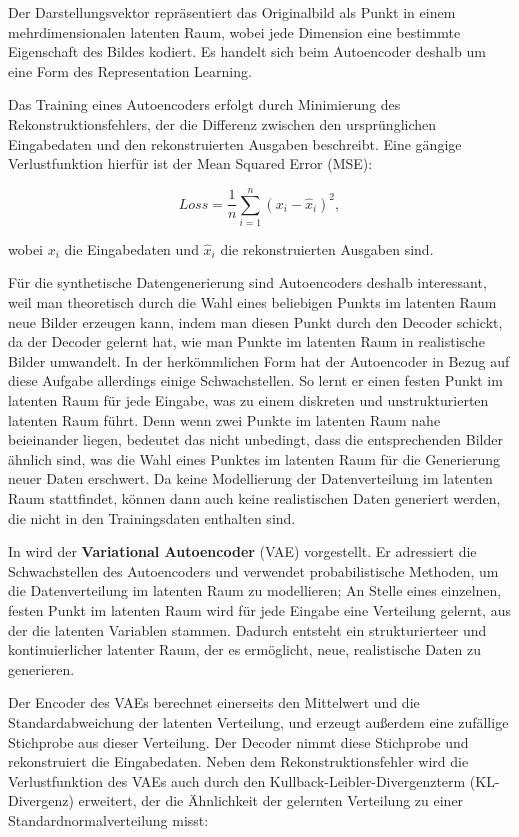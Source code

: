 Der Darstellungsvektor repräsentiert das Originalbild als Punkt in einem mehrdimensionalen latenten Raum, wobei jede Dimension eine bestimmte Eigenschaft des Bildes kodiert. Es handelt sich beim Autoencoder deshalb um eine Form des Representation Learning.

Das Training eines Autoencoders erfolgt durch Minimierung des Rekonstruktionsfehlers, der die Differenz zwischen den ursprünglichen Eingabedaten und den rekonstruierten Ausgaben beschreibt. Eine gängige Verlustfunktion hierfür ist der Mean Squared Error (MSE):

\begin{equation}
	Loss=\frac{1}{n}\sum_{i=1}^n (x_i-\hat{x}_i)^2,
	\label{eq:loss-mse}
\end{equation}

wobei $x_i$ die Eingabedaten und $\hat{x}_i$ die rekonstruierten Ausgaben sind.

Für die synthetische Datengenerierung sind Autoencoders deshalb interessant, weil man theoretisch durch die Wahl eines beliebigen Punkts im latenten Raum neue Bilder erzeugen kann, indem man diesen Punkt durch den Decoder schickt, da der Decoder gelernt hat, wie man Punkte im latenten Raum in realistische Bilder umwandelt. \parencite{Foster2020gendeeplearning} In der herkömmlichen Form hat der Autoencoder in Bezug auf diese Aufgabe allerdings einige Schwachstellen. So lernt er einen festen Punkt im latenten Raum für jede Eingabe, was zu einem diskreten und unstrukturierten latenten Raum führt. Denn wenn zwei Punkte im latenten Raum nahe beieinander liegen, bedeutet das nicht unbedingt, dass die entsprechenden Bilder ähnlich sind, was die Wahl eines Punktes im latenten Raum für die Generierung neuer Daten erschwert. Da keine Modellierung der Datenverteilung im latenten Raum stattfindet, können dann auch keine realistischen Daten generiert werden, die nicht in den Trainingsdaten enthalten sind.

In \parencite{Kingma2022vae} wird der \textbf{Variational Autoencoder} (VAE) vorgestellt. Er adressiert die Schwachstellen des Autoencoders und verwendet probabilistische Methoden, um die Datenverteilung im latenten Raum zu modellieren; An Stelle eines einzelnen, festen Punkt im latenten Raum wird für jede Eingabe eine Verteilung gelernt, aus der die latenten Variablen stammen. Dadurch entsteht ein strukturierteer und kontinuierlicher latenter Raum, der es ermöglicht, neue, realistische Daten zu generieren.

Der Encoder des VAEs berechnet einerseits den Mittelwert und die Standardabweichung der latenten Verteilung, und erzeugt außerdem eine zufällige Stichprobe aus dieser Verteilung. Der Decoder nimmt diese Stichprobe und rekonstruiert die Eingabedaten. Neben dem Rekonstruktionsfehler wird die Verlustfunktion des VAEs auch durch den Kullback-Leibler-Divergenzterm (KL-Divergenz) erweitert, der die Ähnlichkeit der gelernten Verteilung zu einer Standardnormalverteilung misst:

